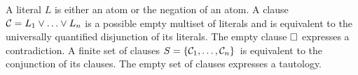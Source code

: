 
\begin{definition}\label{def:literals}
A {\myem literal} $L$ is either an atom or the negation of an atom.
%
A {\myem clause}\ \ ${\mathcal C} = L_1\lor\ldots\lor L_n$  is a possible empty multiset of literals 
and is equivalent to the universally quantified disjunction of its literals.
The {\myem empty clause} $\square$ expresses a contradiction. 
%
A finite {\myem set of clauses} $S=\{ {\mathcal C}_1,\ldots,{\mathcal C}_n \}$ is equivalent to the conjunction of its clauses.
The empty set of clauses expresses a tautology.

\end{definition}